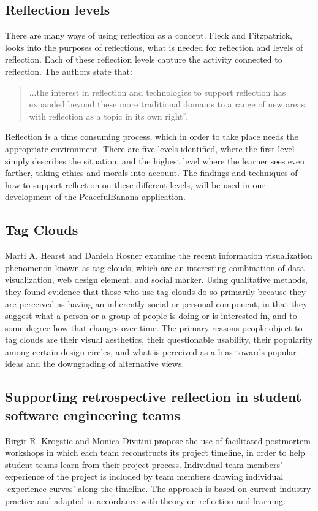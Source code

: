 \subsection*{Reflection levels}
There are many ways of using reflection as a concept. Fleck and Fitzpatrick\cite{Fleck2010}, looks into the purposes of reflections, what is needed for reflection and levels of reflection. Each of these reflection levels capture the activity connected to reflection. The authors state that: 
\begin{quotation}
...the interest in reflection and technologies to support reflection has expanded beyond these more traditional domains to a range of new areas, with reflection as a topic in its own right”. 
\end{quotation}
Reflection is a time consuming process, which in order to take place needs the appropriate environment. There are five levels identified, where the first level simply describes the situation, and the highest level where the learner sees even farther, taking ethics and morals into account. The findings and techniques of how to support reflection on these different levels\cite{Fleck2010}, will be used in our development of the PeacefulBanana application. 

\subsection{Tag Clouds}
Marti A. Hearst and Daniela Rosner\cite{Hearst2008} examine the recent information visualization phenomenon known as tag clouds, which are an interesting combination of data visualization, web design element, and social marker. Using qualitative methods, they found evidence that those who use tag clouds do so primarily because they are perceived as having an inherently social or personal component, in that they suggest what a person or a group of people is doing or is interested in, and to some degree how that changes over time. The primary reasons people object to tag clouds are their visual aesthetics, their questionable usability, their popularity among certain design circles, and what is perceived as a bias towards popular ideas and the downgrading of alternative views.

\subsection{Supporting retrospective reflection in student software engineering teams}
Birgit R. Krogstie and Monica Divitini\cite{Krogstie2009} propose the use of facilitated postmortem workshops in which each team reconstructs its project timeline, in order to help student teams learn from their project process. Individual team members’ experience of the project is included by team members drawing individual ‘experience curves’ along the timeline. The approach is based on current industry practice and adapted in accordance with theory on reflection and learning.

